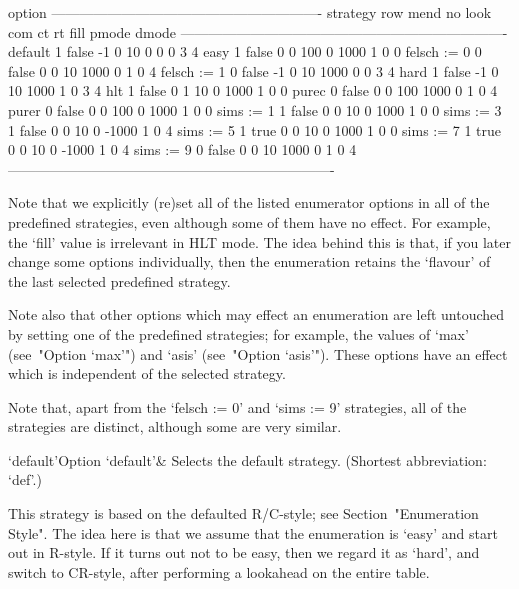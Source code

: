 \begintt
                                option
            ----------------------------------------------------------
strategy    row   mend  no  look  com    ct     rt  fill  pmode  dmode
----------------------------------------------------------------------
default       1  false  -1     0   10     0      0     0      3      4
easy          1  false   0     0  100     0   1000     1      0      0
felsch := 0   0  false   0     0   10  1000      0     1      0      4
felsch := 1   0  false  -1     0   10  1000      0     0      3      4
hard          1  false  -1     0   10  1000      1     0      3      4
hlt           1  false   0     1   10     0   1000     1      0      0
purec         0  false   0     0  100  1000      0     1      0      4
purer         0  false   0     0  100     0   1000     1      0      0
sims := 1     1  false   0     0   10     0   1000     1      0      0
sims := 3     1  false   0     0   10     0  -1000     1      0      4
sims := 5     1   true   0     0   10     0   1000     1      0      0
sims := 7     1   true   0     0   10     0  -1000     1      0      4
sims := 9     0  false   0     0   10  1000      0     1      0      4
----------------------------------------------------------------------
\endtt

Note that we explicitly (re)set all of the listed  enumerator  options
in all of the predefined strategies, even although some of  them  have
no effect. For example, the `fill' value is irrelevant  in  HLT  mode.
The idea behind this  is  that,  if  you  later  change  some  options
individually, then the enumeration retains the  \lq{}flavour'  of  the
last selected predefined strategy.

Note also that other options which may effect an enumeration are  left
untouched by setting one of the predefined  strategies;  for  example,
the values of  `max'  (see~"Option  `max'")  and  `asis'  (see~"Option
`asis'"). These options have an effect which  is  independent  of  the
selected strategy.

Note that, apart from the `felsch := 0' and `sims  :=  9'  strategies,
all of the strategies are distinct, although some are very similar.


\beginitems

\>`default'{Option `default'}&
Selects the default strategy. (Shortest abbreviation: `def'.)

This   strategy   is   based   on   the   defaulted   R/C-style;   see
Section~"Enumeration Style". The idea here is that we assume that  the
enumeration is \lq{}easy' and start out in R-style. If  it  turns  out
not to be easy, then  we  regard  it  as  \lq{}hard',  and  switch  to
CR-style, after performing a lookahead on the entire table.

